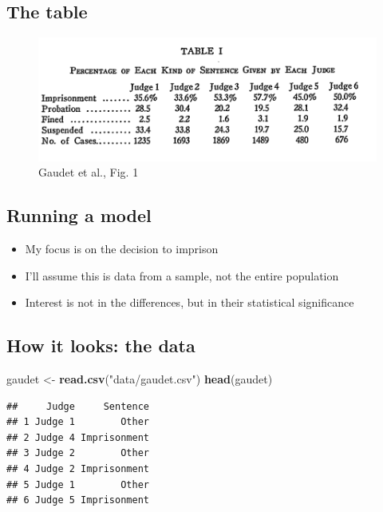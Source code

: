 \documentclass[12pt,twoside]{article}
\newenvironment{Shaded}{}{}
\newcommand{\KeywordTok}[1]{\textcolor[rgb]{0.00,0.44,0.13}{\textbf{{#1}}}}
\newcommand{\StringTok}[1]{\textcolor[rgb]{0.25,0.44,0.63}{{#1}}}
\newcommand{\NormalTok}[1]{{#1}}
\providecommand{\tightlist}{%
  \setlength{\itemsep}{0pt}\setlength{\parskip}{0pt}}
\begin{document}
\subsection{The table}\label{the-table}

\begin{figure}[htbp]
\centering
\includegraphics{figure/gaudet_tab1.png}
\caption{Gaudet et al., Fig. 1}
\end{figure}

\subsection{Running a model}\label{running-a-model}

\begin{itemize}
\tightlist
\item
  My focus is on the decision to imprison
\item
  I'll assume this is data from a sample, not the entire population
\item
  Interest is not in the differences, but in their statistical
  significance
\end{itemize}

\subsection{How it looks: the data}\label{how-it-looks-the-data}

\begin{Shaded}
\begin{Highlighting}[]
\NormalTok{gaudet <-}\StringTok{ }\KeywordTok{read.csv}\NormalTok{(}\StringTok{"data/gaudet.csv"}\NormalTok{)}
\KeywordTok{head}\NormalTok{(gaudet)}
\end{Highlighting}
\end{Shaded}

\begin{verbatim}
##     Judge     Sentence
## 1 Judge 1        Other
## 2 Judge 4 Imprisonment
## 3 Judge 2        Other
## 4 Judge 2 Imprisonment
## 5 Judge 1        Other
## 6 Judge 5 Imprisonment
\end{verbatim}
\end{document}
